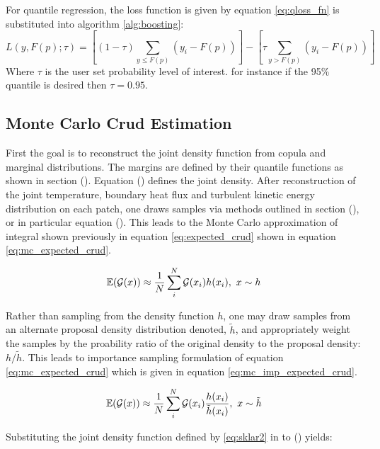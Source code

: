 For quantile regression, the loss function is given by equation \ref{eq:qloss_fn} is substituted into algorithm \ref{alg:boosting}:
\begin{equation}
L(y, F(p);\tau) = \left[ (1-\tau) \sum_{y \leq F(p)}( y_i - F(p) ) \right] - \left[ \tau \sum_{y > F(p)} (y_i - F(p)) \right]
\end{equation}
Where $\tau$ is the user set probability level of interest. for instance if the 95\% quantile is desired then $\tau=0.95$.



\subsection{Monte Carlo Crud Estimation}


First the goal is to reconstruct the joint density function from copula and marginal distributions.  The margins are defined by their quantile functions as shown in section ().  Equation () defines the joint density. After reconstruction of the joint temperature, boundary heat flux and turbulent kinetic energy distribution on each patch, one draws samples via methods outlined in section (), or in particular equation ().  This leads to the Monte Carlo approximation of integral shown previously in equation \ref{eq:expected_crud} shown in equation \ref{eq:mc_expected_crud}.

\begin{equation}
\operatorname*{\mathbb{E}}(\mathcal G(x)) \approx \frac{1}{N} \sum_i^N \mathcal G(x_i) h(x_i), \ x \sim {h}
\label{eq:mc_expected_crud}
\end{equation}

Rather than sampling from the density function $h$, one may draw samples from an alternate proposal density distribution denoted, $\tilde h$, and appropriately weight the samples by the proability ratio of the original density to the proposal density: $h/\tilde h$.  This leads to importance sampling formulation of equation \ref{eq:mc_expected_crud} which is given in equation \ref{eq:mc_imp_expected_crud}.

\begin{equation}
\operatorname*{\mathbb{E}}(\mathcal G(x)) \approx \frac{1}{N} \sum_i^N \mathcal G(x_i) \frac{h(x_i)}{\tilde h(x_i)}, \ x \sim \tilde{h}
\label{eq:mc_imp_expected_crud}
\end{equation}

Substituting the joint density function defined by \ref{eq:sklar2} in to () yields:

